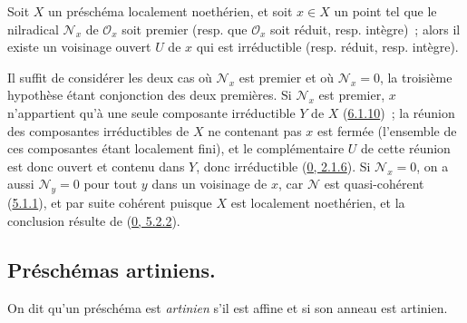 \begin{proposition}[6.1.13]
\label{I.6.1.13-fr}
Soit $X$ un préschéma localement noethérien, et soit $x\in X$ un point tel que
le nilradical $\mathscr{N}_x$ de $\mathscr{O}_x$ soit premier (resp. que
$\mathscr{O}_x$ soit réduit, resp. intègre)~; alors il existe un voisinage
ouvert $U$ de $x$ qui est irréductible (resp. réduit, resp. intègre).
\end{proposition}

Il suffit de considérer les deux cas où $\mathscr{N}_x$ est premier et où
$\mathscr{N}_x=0$, la troisième hypothèse étant conjonction des deux
premières. Si $\mathscr{N}_x$ est premier, $x$ n'appartient qu'à une seule
composante irréductible $Y$ de $X$ (\hyperref[I.6.1.10-fr]{6.1.10})~; la
réunion des composantes irréductibles de $X$ ne contenant pas $x$ est fermée
(l'ensemble de ces composantes étant localement fini), et le complémentaire
$U$ de cette réunion est donc ouvert et contenu dans $Y$, donc irréductible
(\hyperref[0.2.1.6-fr]{0, 2.1.6}). Si $\mathscr{N}_x=0$, on a aussi
$\mathscr{N}_y=0$ pour tout $y$ dans un voisinage de $x$, car $\mathscr{N}$
est quasi-cohérent (\hyperref[I.5.1.1-fr]{5.1.1}), et par suite cohérent
puisque $X$ est localement noethérien, et la conclusion résulte de
(\hyperref[0.5.2.2-fr]{0, 5.2.2}).

\subsection{Préschémas artiniens.}
\label{subsection:I.6.2-fr}

\begin{definition}[6.2.1]
\label{I.6.2.1-fr}
On dit qu'un préschéma est \emph{artinien} s'il est affine et si son anneau
est artinien.
\end{definition}

